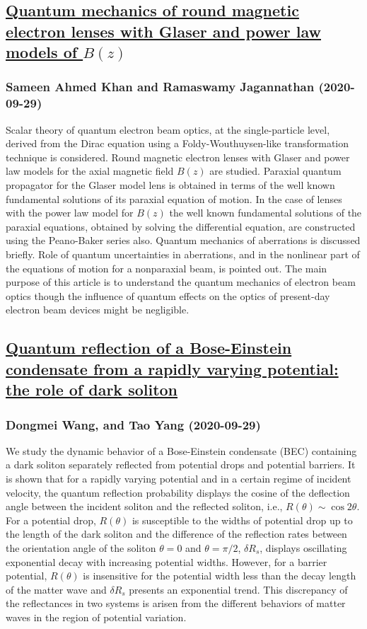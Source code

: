\subsection*{\href{http://arxiv.org/abs/2009.13943v1}{Quantum mechanics of round magnetic electron lenses with Glaser and  power law models of $B(z)$}}
\subsubsection*{Sameen Ahmed Khan and Ramaswamy Jagannathan (2020-09-29)}
Scalar theory of quantum electron beam optics, at the single-particle level,
derived from the Dirac equation using a Foldy-Wouthuysen-like transformation
technique is considered. Round magnetic electron lenses with Glaser and power
law models for the axial magnetic field $B(z)$ are studied. Paraxial quantum
propagator for the Glaser model lens is obtained in terms of the well known
fundamental solutions of its paraxial equation of motion. In the case of lenses
with the power law model for $B(z)$ the well known fundamental solutions of the
paraxial equations, obtained by solving the differential equation, are
constructed using the Peano-Baker series also. Quantum mechanics of aberrations
is discussed briefly. Role of quantum uncertainties in aberrations, and in the
nonlinear part of the equations of motion for a nonparaxial beam, is pointed
out. The main purpose of this article is to understand the quantum mechanics of
electron beam optics though the influence of quantum effects on the optics of
present-day electron beam devices might be negligible.

\subsection*{\href{http://arxiv.org/abs/2009.13942v1}{Quantum reflection of a Bose-Einstein condensate from a rapidly varying  potential: the role of dark soliton}}
\subsubsection*{Dongmei Wang, and Tao Yang (2020-09-29)}
We study the dynamic behavior of a Bose-Einstein condensate (BEC) containing
a dark soliton separately reflected from potential drops and potential
barriers. It is shown that for a rapidly varying potential and in a certain
regime of incident velocity, the quantum reflection probability displays the
cosine of the deflection angle between the incident soliton and the reflected
soliton, i.e., $R(\theta) \sim \cos 2\theta$. For a potential drop, $R(\theta)$
is susceptible to the widths of potential drop up to the length of the dark
soliton and the difference of the reflection rates between the orientation
angle of the soliton $\theta=0$ and $\theta=\pi/2$, $\delta R_s$, displays
oscillating exponential decay with increasing potential widths. However, for a
barrier potential, $R(\theta)$ is insensitive for the potential width less than
the decay length of the matter wave and $\delta R_s$ presents an exponential
trend. This discrepancy of the reflectances in two systems is arisen from the
different behaviors of matter waves in the region of potential variation.

